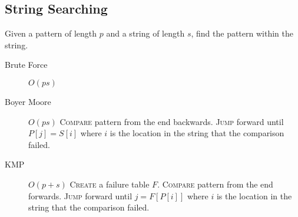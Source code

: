 \documentclass[landscape]{cheat}
\begin{document}
\begin{multicols}{3}
\section{String Searching}
Given a pattern of length $p$ and a string of length $s$, find the pattern within the string.
\begin{description}
    \item[Brute Force]
        $O(ps)$
    \item[Boyer Moore]
        $O(ps)$
        \textsc{Compare} pattern from the end backwards. 
        \textsc{Jump} forward until $P[j]=S[i]$ where $i$ is the location in the string that the comparison failed.
    \item[KMP]
        $O(p + s)$
        \textsc{Create} a failure table $F$.
        \textsc{Compare} pattern from the end forwards.
        \textsc{Jump} forward until $j=F[P[i]]$ where $i$ is the location in the string that the comparison failed.
\end{description}

\end{multicols}
\end{document}
